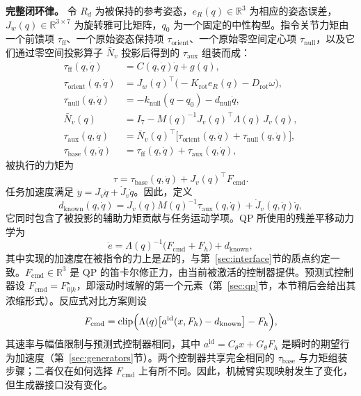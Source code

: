 \documentclass[journal]{IEEEtran}
\begin{document}
\noindent\textbf{完整闭环律。} 令 $R_d$ 为被保持的参考姿态，$e_R(q)\in\mathbb R^3$ 为相应的姿态误差，$J_w(q)\in\mathbb R^{3\times7}$ 为旋转雅可比矩阵，$q_0$ 为一个固定的中性构型。指令关节力矩由一个前馈项 $\tau_{\mathrm{ff}}$、一个原始姿态保持项 $\tau_{\mathrm{orient}}$、一个原始零空间定心项 $\tau_{\mathrm{null}}$，以及它们通过零空间投影算子 $\bar N_v$ 投影后得到的 $\tau_{\mathrm{aux}}$ 组装而成：
\begin{equation}
\begin{aligned}
\tau_{\mathrm{ff}}(q,\dot q)&=C(q,\dot q)\dot q+g(q),\\
\tau_{\mathrm{orient}}(q,\dot q)&=J_w(q)^\top\bigl(-K_{\mathrm{rot}}e_R(q)-D_{\mathrm{rot}}\omega\bigr),\\
\tau_{\mathrm{null}}(q,\dot q)&=-k_{\mathrm{null}}(q-q_0)-d_{\mathrm{null}}\dot q,\\
\bar N_v(q)&=I_7-M(q)^{-1}J_v(q)^\top\Lambda(q)\,J_v(q),\\
\tau_{\mathrm{aux}}(q,\dot q)&=\bar N_v(q)^\top\bigl[\tau_{\mathrm{orient}}(q,\dot q)+\tau_{\mathrm{null}}(q,\dot q)\bigr],\\
\tau_{\mathrm{base}}(q,\dot q)&=\tau_{\mathrm{ff}}(q,\dot q)+\tau_{\mathrm{aux}}(q,\dot q),
\end{aligned}
\end{equation}
被执行的力矩为
\begin{equation}
\tau=\tau_{\mathrm{base}}(q,\dot q)+J_v(q)^\top F_{\mathrm{cmd}}.
\end{equation}
任务加速度满足 $\ddot y=J_v\ddot q+\dot J_v\dot q$。因此，定义
\begin{equation}
d_{\mathrm{known}}(q,\dot q) =J_v(q)M(q)^{-1}\tau_{\mathrm{aux}}(q,\dot q)
+\dot J_v(q,\dot q)\dot q,
\end{equation}
它同时包含了被投影的辅助力矩贡献与任务运动学项。QP 所使用的残差平移动力学为
\begin{equation}
\ddot e=\Lambda(q)^{-1}\bigl(F_{\mathrm{cmd}}+F_h\bigr)+d_{\mathrm{known}},
\end{equation}
其中实现的加速度在被指令的力上是\emph{正}的，与第~\ref{sec:interface}节的质点约定一致。$F_{\mathrm{cmd}}\in\mathbb R^3$ 是 QP 的笛卡尔修正力，由当前被激活的控制器提供。预测式控制器设 $F_{\mathrm{cmd}}=F_{0|k}^\star$，即滚动时域解的第一个元素（第~\ref{sec:qp}节，本节稍后会给出其浓缩形式）。反应式对比方案则设
\begin{equation}
F_{\mathrm{cmd}}=\operatorname{clip}\Bigl(\Lambda(q)\bigl[a^{\mathrm{id}}(x,F_h)-d_{\mathrm{known}}\bigr]-F_h\Bigr),
\end{equation}
其速率与幅值限制与预测式控制器相同，其中 $a^{\mathrm{id}}=C_\theta x+G_\theta F_h$ 是瞬时的期望行为加速度（第~\ref{sec:generators}节）。两个控制器共享完全相同的 $\tau_{\mathrm{base}}$ 与力矩组装步骤；二者仅在如何选择 $F_{\mathrm{cmd}}$ 上有所不同。因此，机械臂实现映射发生了变化，但生成器接口没有变化。
\end{document}
